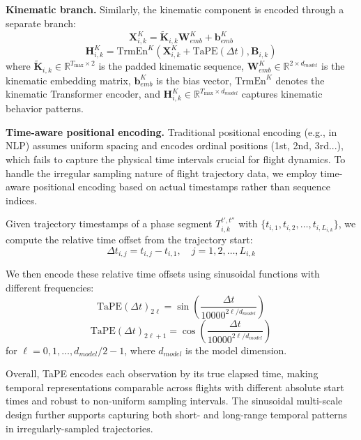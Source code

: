 \documentclass[iicol,pdflatex,sn-basic,Numbered]{sn-jnl}%
\theoremstyle{thmstyleone}%
\theoremstyle{thmstyletwo}%
\theoremstyle{thmstylethree}%
\begin{document}
\textbf{Kinematic branch.} Similarly, the kinematic component is encoded through a separate branch:
\begin{equation}
\mathbf{X}_{i,k}^K = \tilde{\mathbf{K}}_{i,k} \mathbf{W}_{emb}^K + \mathbf{b}_{emb}^K
\end{equation}
\begin{equation}
\mathbf{H}_{i,k}^K = \text{TrmEn}^K(\mathbf{X}_{i,k}^K + \mathrm{TaPE}(\Delta t), \mathbf{B}_{i,k})
\end{equation}
where $\tilde{\mathbf{K}}_{i,k} \in \mathbb{R}^{T_{\max} \times 2}$ is the padded kinematic sequence, $\mathbf{W}_{emb}^K \in \mathbb{R}^{2 \times d_{model}}$ is the kinematic embedding matrix, $\mathbf{b}_{emb}^K$ is the bias vector, $\text{TrmEn}^K$ denotes the kinematic Transformer encoder, and $\mathbf{H}_{i,k}^K \in \mathbb{R}^{T_{\max} \times d_{model}}$ captures kinematic behavior patterns.

\textbf{Time-aware positional encoding.} Traditional positional encoding (e.g., in NLP) assumes uniform spacing and encodes ordinal positions (1st, 2nd, 3rd...), which fails to capture the physical time intervals crucial for flight dynamics.
To handle the irregular sampling nature of flight trajectory data, we employ time-aware positional encoding based on actual timestamps rather than sequence indices.

Given trajectory timestamps of a phase segment $T^{t',t''}_{i,k}$ with $\{t_{i,1}, t_{i,2}, \ldots, t_{i,L_{i,k}}\}$, we compute the relative time offset from the trajectory start:
\begin{equation}
\Delta t_{i,j} = t_{i,j} - t_{i,1}, \quad j = 1, 2, \ldots, L_{i,k}
\end{equation}

We then encode these relative time offsets using sinusoidal functions with different frequencies:
\begin{equation}
\mathrm{TaPE}(\Delta t)_{2\ell} = \sin\left(\frac{\Delta t}{10000^{2\ell/d_{model}}}\right)
\end{equation}
\begin{equation}
\mathrm{TaPE}(\Delta t)_{2\ell+1} = \cos\left(\frac{\Delta t}{10000^{2\ell/d_{model}}}\right)
\end{equation}
for $\ell = 0, 1, \ldots, d_{model}/2 - 1$, where $d_{model}$ is the model dimension.

Overall, TaPE encodes each observation by its true elapsed time, making temporal representations comparable across flights with different absolute start times and robust to non-uniform sampling intervals. The sinusoidal multi-scale design further supports capturing both short- and long-range temporal patterns in irregularly-sampled trajectories.
\end{document}
